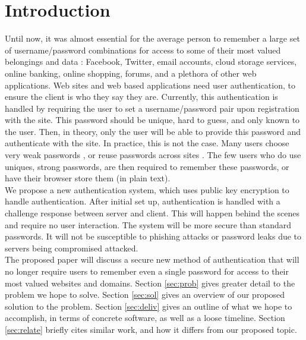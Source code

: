 \documentclass[11pt]{article}   %
\begin{document}
\section{Introduction}
Until now, it was almost essential for the average person to remember a large set of username/password combinations for access to some of their most valued belongings and data : Facebook, Twitter, email accounts, cloud storage services, online banking, online shopping, forums, and a plethora of other web applications. Web sites and web based applications need user authentication, to ensure the client is who they say they are. Currently, this authentication is handled by requiring the user to set a username/password pair upon registration with the site. This password should be unique, hard to guess, and only known to the user. Then, in theory, only the user will be able to provide this password and authenticate with the site. In practice, this is not the case. Many users choose very weak passwords \cite{habits}, or reuse passwords across sites \cite{domino}. The few users who do use uniques, strong passwords, are then required to remember these passwords, or have their browser store them (in plain text).\\
We propose a new authentication system, which uses public key encryption to handle authentication. After initial set up, authentication is handled with a challenge response between server and client. This will happen behind the scenes and require no user interaction. The system will be more secure than standard passwords. It will not be susceptible to phishing attacks or password leaks due to servers being compromised attacked.\\
The proposed paper will discuss a secure new method of authentication that will no longer require users to remember even a single password for access to their most valued websites and domains. Section \ref{sec:prob} gives greater detail to the problem we hope to solve. Section \ref{sec:sol} gives an overview of our proposed solution to the problem. Section \ref{sec:deliv} gives an outline of what we hope to accomplish, in terms of concrete software, as well as a loose timeline. Section \ref{sec:relate} briefly cites similar work, and how it differs from our proposed topic.
\end{document}
